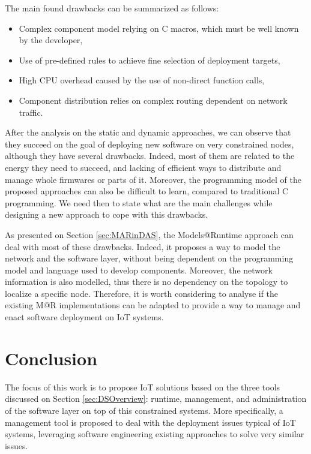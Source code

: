The main found drawbacks can be summarized as follows:
\begin{itemize}
	\item Complex component model relying on C macros, which must be well known by the developer,
	\item Use of pre-defined rules to achieve fine selection of deployment targets,
	\item High CPU overhead caused by the use of non-direct function calls,
	\item Component distribution relies on complex routing dependent on network traffic.
\end{itemize}

After the analysis on the static and dynamic approaches, we can observe that they succeed on the goal of deploying new software on very constrained nodes, although they have several drawbacks.
Indeed, most of them are related to the energy they need to succeed, and lacking of efficient ways to distribute and manage whole firmwares or parts of it.
Moreover, the programming model of the proposed approaches can also be difficult to learn, compared to traditional C programming.
We need then to state what are the main challenges while designing a new approach to cope with this drawbacks.

As presented on Section \ref{sec:MARinDAS}, the Models@Runtime approach can deal with most of these drawbacks.
Indeed, it proposes a way to model the network and the software layer, without being dependent on the programming model and language used to develop components.
Moreover, the network information is also modelled, thus there is no dependency on the topology to localize a specific node.
Therefore, it is worth considering to analyse if the existing M@R implementations can be adapted to provide a way to manage and enact software deployment on IoT systems.

\section{Conclusion}
The focus of this work is to propose IoT solutions based on the three tools discussed on Section \ref{sec:DSOverview}: runtime, management, and administration of the software layer on top of this constrained systems.
More specifically, a management tool is proposed to deal with the deployment issues typical of IoT systems, leveraging software engineering existing approaches to solve very similar issues.

